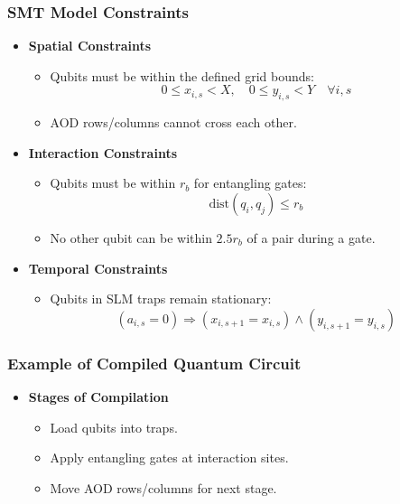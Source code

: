 \documentclass[18 pt]{beamer}
\begin{document}
\begin{frame}
    \frametitle{SMT Model Constraints}
    \begin{itemize}
        \item \textbf{Spatial Constraints}
        \begin{itemize}
            \item Qubits must be within the defined grid bounds:
            \[
            0 \leq x_{i,s} < X, \quad 0 \leq y_{i,s} < Y \quad \forall i, s
            \]
            \item AOD rows/columns cannot cross each other.
        \end{itemize}
        \item \textbf{Interaction Constraints}
        \begin{itemize}
            \item Qubits must be within \( r_b \) for entangling gates:
            \[
            \text{dist}(q_i, q_j) \leq r_b
            \]
            \item No other qubit can be within \( 2.5 r_b \) of a pair during a gate.
        \end{itemize}
        \item \textbf{Temporal Constraints}
        \begin{itemize}
            \item Qubits in SLM traps remain stationary:
            \[
            (a_{i,s} = 0) \Rightarrow (x_{i,s+1} = x_{i,s}) \land (y_{i,s+1} = y_{i,s})
            \]
        \end{itemize}
    \end{itemize}
\end{frame}

\begin{frame}
    \frametitle{Example of Compiled Quantum Circuit}
    \begin{itemize}
        \item \textbf{Stages of Compilation}
        \begin{itemize}
            \item Load qubits into traps.
            \item Apply entangling gates at interaction sites.
            \item Move AOD rows/columns for next stage.
        \end{itemize}
    \end{itemize}
\end{frame}
\end{document}
